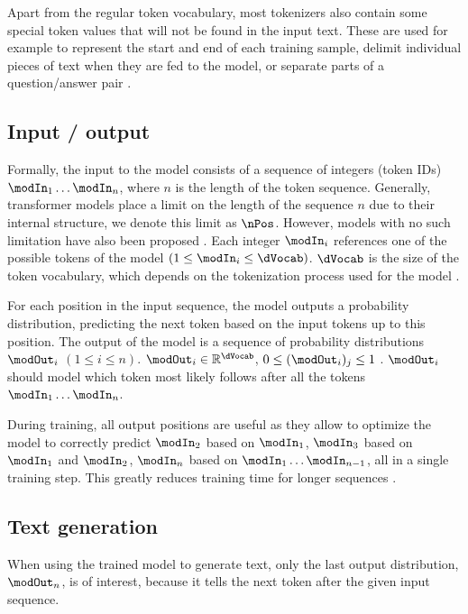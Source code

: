 Apart from the regular token vocabulary, most tokenizers also contain some special token values that will not be found in the input text. These are used for example to represent the start and end of each training sample, delimit individual pieces of text when they are fed to the model, or separate parts of a question/answer pair \cite{HuggingFaceTokenizers}.


\subsection{Input / output}
\label{transformer:input}

Formally, the input to the model consists of a sequence of integers (token IDs) $\modIn_1 \ldots \modIn_n$, where $n$ is the length of the token sequence.
Generally, transformer models place a limit on the length of the sequence $n$ due to their internal structure, we denote this limit as $\nPos$. However, models with no such limitation have also been proposed \cite{su2023roformer}.
Each integer $\modIn_i$ references one of the possible tokens of the model $(1 \leq \modIn_i \leq \dVocab)$. $\dVocab$ is the size of the token vocabulary, which depends on the tokenization process used for the model .

\label{transformer:output}

For each position in the input sequence, the model outputs a probability distribution, predicting the next token based on the input tokens up to this position. 
The output of the model is a sequence of probability distributions $\modOut_i$ $(1 \leq i \leq n)$. $\modOut_i \in \mathbb{R}^\dVocab$, $0 \leq (\modOut_i)_j \leq 1$  \cite{HuggingFaceGPT2}.
$\modOut_i$ should model which token most likely follows after all the tokens $\modIn_1 \ldots \modIn_n$.

During training, all output positions are useful as they allow to optimize the model to correctly predict $\modIn_2$ based on $\modIn_1$,
$\modIn_3$ based on $\modIn_1$ and $\modIn_2$, $\modIn_n$ based on $\modIn_1 \ldots \modIn_{n-1}$, all in a single training step. This greatly reduces training time for longer sequences \cite{alammar-gpt2}.

\subsection{Text generation}
\label{transformer:textgen}

When using the trained model to generate text, only the last output distribution, $\modOut_n$, is of interest, because
it tells the next token after the given input sequence. \cite{Mao2021Autoregressive}


